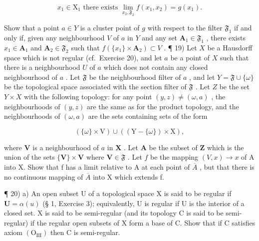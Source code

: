 \[
x _ {1} \in \mathrm{X} _ {1} \text { there   exists } \lim _ {x _ {2}, \mathfrak {F} _ {2}} f (x _ {1}, x _ {2}) = g (x _ {1}).
\]

Show that a point \(a \in Y\) is a cluster point of \(g\) with respect to the filter \(\mathfrak{F}_1\) if and only if, given any neighbourhood \(V\) of \(a\) in \(Y\) and any set \(\mathbf{A}_1 \in \mathfrak{F}_1\) , there exists \(x_1 \in \mathbf{A}_1\) and \(\mathbf{A}_2 \in \mathfrak{F}_2\) such that \(f(\{x_1\} \times \mathbf{A}_2) \subset V\) . ¶ 19) Let \(X\) be a Hausdorff space which is not regular (cf.~Exercise 20), and let \(a\) be a point of \(X\) such that there is a neighbourhood \(U\) of \(a\) which does not contain any closed neighbourhood of \(a\) . Let \(\mathfrak{F}\) be the neighbourhood filter of \(a\) , and let \(Y = \mathfrak{F} \cup \{\omega\}\) be the topological space associated with the section filter of \(\mathfrak{F}\) . Let \(Z\) be the set \(Y \times X\) with the following topology: for any point \((y, z) \neq (\omega, a)\) , the neighbourhoods of \((y, z)\) are the same as for the product topology, and the neighbourhoods of \((\omega, a)\) are the sets containing sets of the form

\[
(\{\omega \} \times \mathrm{V}) \cup ((\mathrm{Y} - \{\omega \}) \times \mathrm{X}),
\]

where \(\mathbf{V}\) is a neighbourhood of \(a\) in \(\mathbf{X}\) . Let \(\mathbf{A}\) be the subset of \(\mathbf{Z}\) which is the union of the sets \(\{\mathbf{V}\} \times \mathbf{V}\) where \(\mathbf{V} \in \mathfrak{F}\) . Let \(f\) be the mapping \((V, x) \rightarrow x\) of A into X. Show that f has a limit relative to A at each point of \(\overline{A}\) , but that there is no continuous mapping of \(\overline{A}\) into X which extends f.

¶ 20) a) An open subset U of a topological space X is said to be regular if \(\mathbf{U} = \alpha(u)\) (§ 1, Exercise 3); equivalently, U is regular if U is the interior of a closed set. X is said to be semi-regular (and its topology C is said to be semi-regular) if the regular open subsets of X form a base of C. Show that if C satisfies axiom \((\mathrm{O}_{\mathrm{III}})\) then C is semi-regular.

